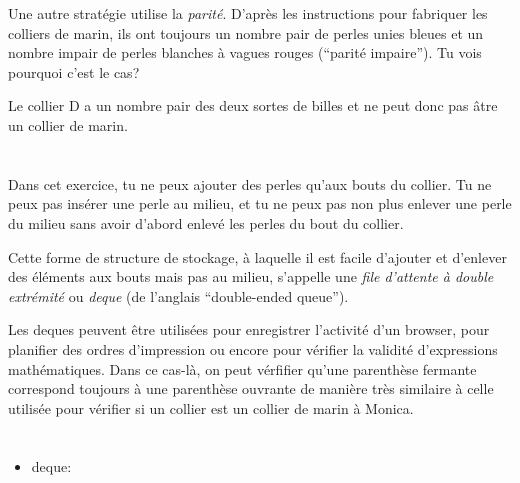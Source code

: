 {{Une autre stratégie utilise la \emph{parité}. D’après les instructions pour fabriquer les colliers de marin, ils ont toujours un nombre pair de perles unies bleues et un nombre impair de perles blanches à vagues rouges (“parité impaire”). Tu vois pourquoi c’est le cas?

Le collier D a un nombre pair des deux sortes de billes et ne peut donc pas âtre un collier de marin.



\section*{\BrochureItsInformatics}
Dans cet exercice, tu ne peux ajouter des perles qu’aux bouts du collier. Tu ne peux pas insérer une perle au milieu, et tu ne peux pas non plus enlever une perle du milieu sans avoir d’abord enlevé les perles du bout du collier.

Cette forme de structure de stockage, à laquelle il est facile d’ajouter et d’enlever des éléments aux bouts mais pas au milieu, s’appelle une \emph{file d’attente à double extrémité} ou \emph{deque} (de l’anglais “double-ended queue”).

Les deques peuvent être utilisées pour enregistrer l’activité d’un browser, pour planifier des ordres d’impression ou encore pour vérifier la validité d’expressions mathématiques. Dans ce cas-là, on peut vérfifier qu’une parenthèse fermante correspond toujours à une parenthèse ouvrante de manière très similaire à celle utilisée pour vérifier si un collier est un collier de marin à Monica.



\section*{\BrochureWebsitesAndKeywords}
{\raggedright
\begin{itemize}
  \item deque: \href{https://fr.wikipedia.org/wiki/File_d\%27attente_\%C3\%A0_double_extr\%C3\%A9mit\%C3\%A9}{}
\end{itemize}


}

}{}

}
